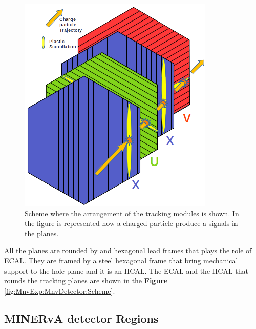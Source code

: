 \begin{figure}[!htb]
\centering
\includegraphics[scale=0.5]{Figures/Chapter2/TrackingModules.png}

        \caption{Scheme where the arrangement of the tracking modules is shown. In the figure is represented how a charged particle produce a signals in the planes.} 
\label{fig:MnvExp:MnvDetector:TrackingModules}
\end{figure}

All the planes are rounded by and hexagonal lead frames that plays the role of ECAL. They are framed by a steel hexagonal frame that bring mechanical support to the hole plane and it is an HCAL. The ECAL and the HCAL that rounds the tracking planes are shown in the \textbf{Figure} \ref{fig:MnvExp:MnvDetector:Scheme}.

\subsection{MINERvA detector Regions}
\label{Cap:MnvExp:MnvDetector:MnvDetectorRegions} 

